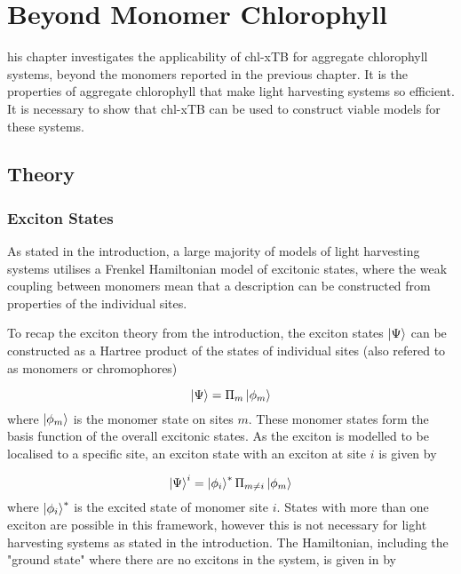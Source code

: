 %
%
\let\textcircled=\pgftextcircled
\chapter{Beyond Monomer Chlorophyll}
\label{chap:excitons}

his chapter investigates the applicability of chl-xTB for aggregate 
chlorophyll systems, beyond the monomers reported in the previous chapter. It is
the properties of aggregate chlorophyll that make light harvesting systems so efficient.
It is necessary to show that chl-xTB can be used to construct viable models for
these systems.

\section{Theory}
\label{sec:exciton_theory}

\subsection{Exciton States}
\label{subsec:exciton_states}
As stated in the introduction, a large majority of models of light harvesting systems
utilises a Frenkel Hamiltonian model of excitonic states, where the weak coupling
between monomers mean that a description can be constructed from properties of the 
individual sites.

To recap the exciton theory from the introduction, the exciton states $\ket{\Psi}$ can
be constructed as a Hartree product of the states of individual sites (also refered
to as monomers or chromophores)

\begin{equation}
    \ket{\Psi} = \Pi_m \ket{\phi_m}
\end{equation}
%
where $\ket{\phi_m}$ is the monomer state on sites $m$. These monomer states form
the basis function of the overall excitonic states. As the exciton is modelled to
be localised to a specific site, an exciton state with an exciton at site $i$ is
given by

\begin{equation}
    \ket{\Psi}^i = \ket{\phi_i}^\ast \Pi_{m \neq i}  \ket{\phi_m}
\end{equation}
%
where $\ket{\phi_i}^\ast$ is the excited state of monomer site $i$. States with 
more than one exciton are possible in this framework, however this is not necessary
for light harvesting systems as stated in the introduction. The Hamiltonian, including
the "ground state" where there are no excitons in the system, is given in by


